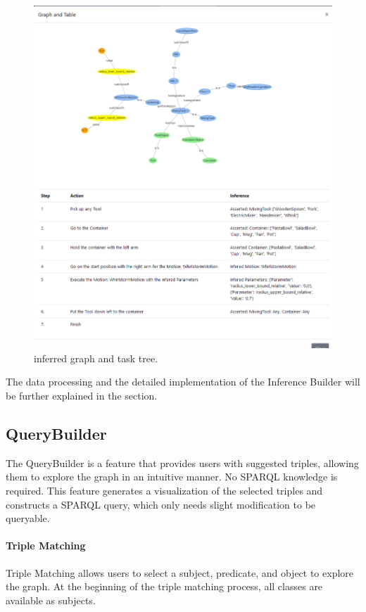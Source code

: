 \begin{figure}[H]
    \includegraphics[scale=0.5]{Graphics/new_inference_graph.png}
    \caption{inferred graph and task tree.}
    \label{fig:graph_inferred}
\end{figure}

The data processing and the detailed implementation of the Inference Builder will be further explained in the  section.
\subsection{QueryBuilder}
The QueryBuilder is a feature that provides users with suggested triples, allowing them to explore the graph in an intuitive manner.
No SPARQL knowledge is required. This feature generates a visualization of the selected triples and constructs a SPARQL query, 
which only needs slight modification to be queryable.

\paragraph{Triple Matching}
Triple Matching allows users to select a subject, predicate, and object to explore the graph. 
At the beginning of the triple matching process, all classes are available as subjects. 

